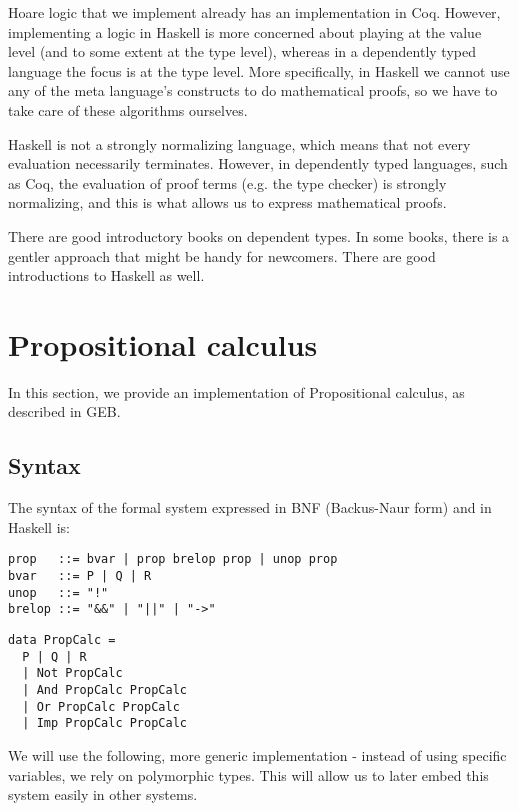 \documentclass{article}
\begin{document}
Hoare logic that we implement already has an implementation in Coq\cite{b3}. However, implementing a logic in Haskell is more concerned about playing at the value level (and to some extent at the type level), whereas in a dependently typed language the focus is at the type level. More specifically, in Haskell we cannot use any of the meta language's constructs to do mathematical proofs, so we have to take care of these algorithms ourselves.

Haskell is not a strongly normalizing language, which means that not every evaluation necessarily terminates. However, in dependently typed languages, such as Coq\cite{b4}, the evaluation of proof terms (e.g. the type checker) is strongly normalizing, and this is what allows us to express mathematical proofs.

There are good introductory books on dependent types\cite{b3}. In some books, there is a gentler approach that might be handy for newcomers\cite{b5}. There are good introductions to Haskell as well\cite{b6}.

\section{Propositional calculus}

In this section, we provide an implementation of Propositional calculus, as described in GEB\cite{b7}.

\subsection{Syntax}

The syntax of the formal system expressed in BNF (Backus-Naur form) and in Haskell is:

\begin{minipage}{0.49\textwidth}
\begin{lstlisting}
prop   ::= bvar | prop brelop prop | unop prop
bvar   ::= P | Q | R
unop   ::= "!"
brelop ::= "&&" | "||" | "->"
\end{lstlisting}
\end{minipage}
\begin{minipage}{0.49\textwidth}
\begin{lstlisting}
data PropCalc =
  P | Q | R
  | Not PropCalc
  | And PropCalc PropCalc
  | Or PropCalc PropCalc
  | Imp PropCalc PropCalc
\end{lstlisting}
\end{minipage}

We will use the following, more generic implementation - instead of using specific variables, we rely on polymorphic types. This will allow us to later embed this system easily in other systems.
\end{document}
